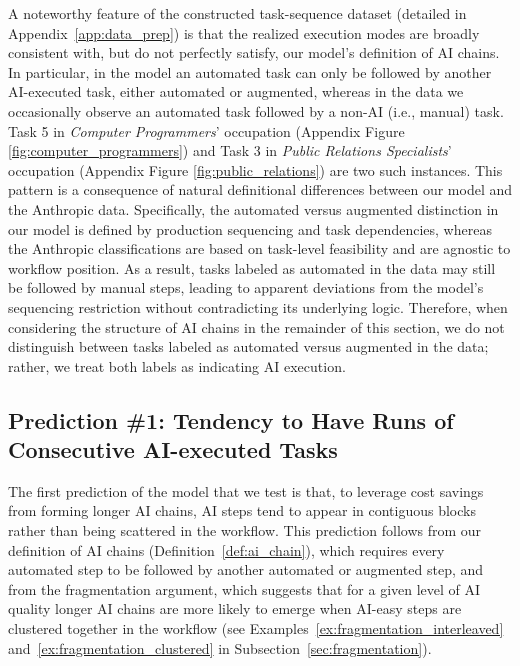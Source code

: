 A noteworthy feature of the constructed task-sequence dataset (detailed in Appendix~\ref{app:data_prep}) is that the realized execution modes are broadly consistent with, but do not perfectly satisfy, our model's definition of AI chains.
In particular, in the model an automated task can only be followed by another AI-executed task, either automated or augmented, whereas in the data we occasionally observe an automated task followed by a non-AI (i.e., manual) task.
Task 5 in \textit{Computer Programmers}' occupation (Appendix Figure \ref{fig:computer_programmers}) and Task 3 in \textit{Public Relations Specialists}' occupation (Appendix Figure \ref{fig:public_relations}) are two such instances.
This pattern is a consequence of natural definitional differences between our model and the Anthropic data.
Specifically, the automated versus augmented distinction in our model is defined by production sequencing and task dependencies, whereas the Anthropic classifications are based on task-level feasibility and are agnostic to workflow position.
As a result, tasks labeled as automated in the data may still be followed by manual steps, leading to apparent deviations from the model's sequencing restriction without contradicting its underlying logic.
Therefore, when considering the structure of AI chains in the remainder of this section, we do not distinguish between tasks labeled as automated versus augmented in the data; rather, we treat both labels as indicating AI execution. %


\subsection{Prediction \#1: Tendency to Have Runs of Consecutive AI-executed Tasks}
\label{sec:chainLength_prediction}

The first prediction of the model that we test is that, to leverage cost savings from forming longer AI chains, AI steps tend to appear in contiguous blocks rather than being scattered in the workflow.
This prediction follows from our definition of AI chains (Definition~\ref{def:ai_chain}), which requires every automated step to be followed by another automated or augmented step, and from the fragmentation argument, which suggests that for a given level of AI quality longer AI chains are more likely to emerge when AI-easy steps are clustered together in the workflow (see Examples~\ref{ex:fragmentation_interleaved} and~\ref{ex:fragmentation_clustered} in Subsection~\ref{sec:fragmentation}).

